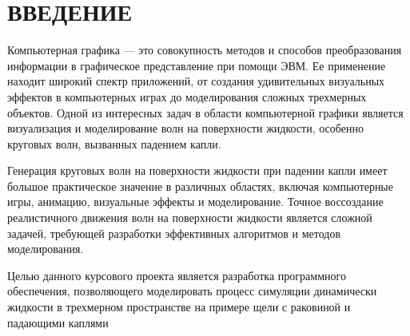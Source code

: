 \chapter*{ВВЕДЕНИЕ}

Компьютерная графика --- это совокупность методов и способов 
преобразования информации в графическое представление при помощи ЭВМ. 
Ее применение находит широкий спектр приложений, от создания удивительных визуальных эффектов в 
компьютерных играх до моделирования сложных трехмерных объектов. 
Одной из интересных задач в области компьютерной графики является визуализация и 
моделирование волн на поверхности жидкости, особенно круговых волн, вызванных падением капли.

Генерация круговых волн на поверхности жидкости при падении капли имеет большое практическое
значение в различных областях, включая компьютерные игры, анимацию, визуальные эффекты и моделирование. 
Точное воссоздание реалистичного движения волн на поверхности жидкости является сложной задачей, 
требующей разработки эффективных алгоритмов и методов моделирования.

Целью данного курсового проекта является разработка программного обеспечения, позволяющего моделировать 
процесс симуляции динамически жидкости в трехмерном пространстве на примере щели с раковиной и падающими каплями
